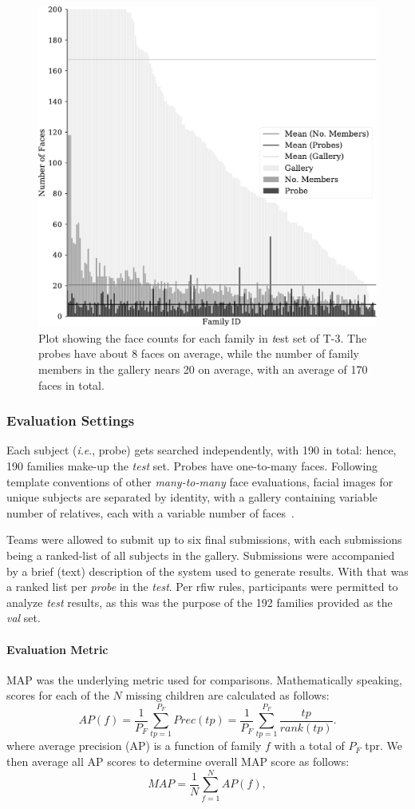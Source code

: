 \documentclass[letterpaper, 10 pt, conference]{ieeeconf}
\newcommand{\ie}{\textit{i}.\textit{e}., }
\begin{document}
\begin{figure}[t!]
    \centering
    \includegraphics[width = .8\linewidth]{figures/barplot-crop.pdf}
    \caption{Plot showing the face counts for each family in {\emph test} set of T-3. The probes have about 8 faces on average, while the number of family members in the gallery nears 20 on average, with an average of 170 faces in total.}
    \label{fig:track3:counts}
\end{figure}
%
\subsubsection{Evaluation Settings} 
Each subject (\ie probe) gets searched independently, with 190 in total: hence, 190 families make-up the \textit{test} set. Probes have one-to-many faces. Following template conventions of other \textit{many-to-many} face evaluations, facial images for unique subjects are separated by identity, with a gallery containing variable number of relatives, each with a variable number of faces~\cite{whitelam2017iarpa}.

Teams were allowed to submit up to six final submissions, with each submissions being a ranked-list of all subjects in the gallery. Submissions were accompanied by a brief (text) description of the system used to generate results. With that was a ranked list per \textit{probe} in the \textit{test}. Per \ac{rfiw} rules, participants were permitted to analyze \emph{test} results, as this was the purpose of the 192 families provided as the \emph{val} set.

\paragraph{Evaluation Metric} 
MAP was the underlying metric used for comparisons. Mathematically speaking, scores for each of the $N$ missing children are calculated as follows:
$$AP(f)=\frac{1}{P_F}\sum^{P_F}_{tp=1}Prec(tp)=\frac{1}{P_F}\sum^{P_F}_{tp=1}\frac{tp}{rank(tp)}.$$
where average precision (AP) is a function of family $f$ with a total of ${P_F}$ \ac{tpr}. We then average all AP scores to determine overall MAP score as follows:
$$MAP = \frac{1}{N}\sum^{N}_{f=1}AP(f),$$
\end{document}
